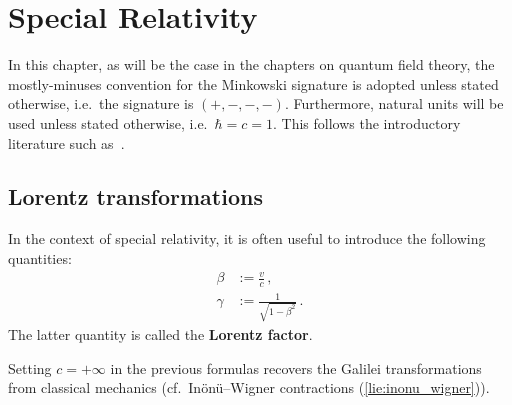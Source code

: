 \chapter{Special Relativity}

    In this chapter, as will be the case in the chapters on quantum field theory, the mostly-minuses convention for the Minkowski signature is adopted unless stated otherwise, i.e.~the signature is $(+,-,-,-)$. Furthermore, natural units will be used unless stated otherwise, i.e.~$\hbar = c = 1$. This follows the introductory literature such as~\citet{greiner_field_1996,peskin_introduction_1995}.

    \minitoc

\section{Lorentz transformations}

    \begin{notation}
        In the context of special relativity, it is often useful to introduce the following quantities:
        \begin{align}
            \beta &:= \frac{v}{c}\,,\\
            \label{relativity:lorentz_factor}
            \gamma &:= \frac{1}{\sqrt{1 - \beta^2}}\,.
        \end{align}
        The latter quantity is called the \textbf{Lorentz factor}.
    \end{notation}
    \begin{remark}
        Setting $c=+\infty$ in the previous formulas recovers the Galilei transformations from classical mechanics (cf.~In\"on\"u--Wigner contractions (\cref{lie:inonu_wigner})).
    \end{remark}

